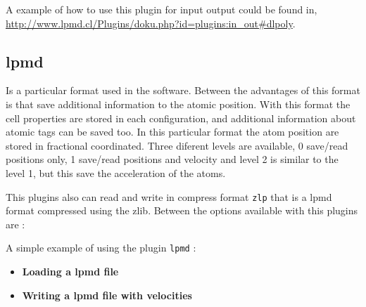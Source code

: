 A example of how to use this plugin for input output could be found in,
\url{http://www.lpmd.cl/Plugins/doku.php?id=plugins:in_out#dlpoly}.

\subsection{lpmd}\label{subsec:lpmdformato}

Is a particular format used in the {\lpmd} software. Between the advantages of
this format is that save additional information to the atomic position. With
this format the cell properties are stored in each configuration, and
additional information about atomic tags can be saved too. In this particular
format the atom position are stored in fractional coordinated. Three diferent
levels are available, 0 save/read positions only, 1 save/read positions and
velocity and level 2 is similar to the level 1, but this save the acceleration
of the atoms.

This plugins also can read and write in compress format \verb|zlp| that is a
lpmd format compressed using the zlib. Between the options available with this
plugins are :


A simple example of using the plugin \verb|lpmd| :

\begin{itemize}
 \item \textbf{Loading a lpmd file}
 \item \textbf{Writing a lpmd file with velocities}
\end{itemize}

